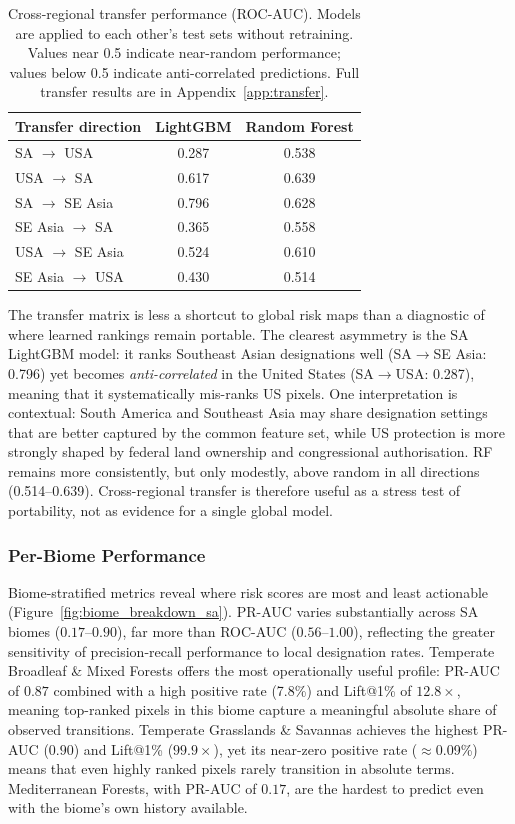 \documentclass[12pt]{article}
\theoremstyle{break}
\begin{document}
\begin{table}[H]
\centering
\caption{Cross-regional transfer performance (ROC-AUC). Models are applied to each
other's test sets without retraining. Values near 0.5 indicate near-random performance;
values below 0.5 indicate anti-correlated predictions. Full transfer results are in
Appendix~\ref{app:transfer}.}
\label{tab:cv3}
\begin{tabular}{lcc}
\toprule
\textbf{Transfer direction} & \textbf{LightGBM} & \textbf{Random Forest} \\
\midrule
SA $\to$ USA        & 0.287 & 0.538 \\
USA $\to$ SA        & 0.617 & 0.639 \\
SA $\to$ SE Asia    & 0.796 & 0.628 \\
SE Asia $\to$ SA    & 0.365 & 0.558 \\
USA $\to$ SE Asia   & 0.524 & 0.610 \\
SE Asia $\to$ USA   & 0.430 & 0.514 \\
\bottomrule
\end{tabular}
\end{table}

The transfer matrix is less a shortcut to global risk maps than a diagnostic of where
learned rankings remain portable. The clearest asymmetry is the SA LightGBM model: it
ranks Southeast Asian designations well (SA$\to$SE Asia: 0.796) yet becomes
\emph{anti-correlated} in the United States (SA$\to$USA: 0.287), meaning that it
systematically mis-ranks US pixels. One interpretation is contextual: South America
and Southeast Asia may share designation settings that are better captured by the
common feature set, while US protection is more strongly shaped by federal land
ownership and congressional authorisation. RF remains more consistently, but only
modestly, above random in all directions (0.514--0.639). Cross-regional transfer is
therefore useful as a stress test of portability, not as evidence for a single global
model.

\subsubsection{Per-Biome Performance}
\label{sec:results_biome_strat}

Biome-stratified metrics reveal where risk scores are most and least actionable
(Figure~\ref{fig:biome_breakdown_sa}). PR-AUC varies substantially across SA biomes
($0.17$--$0.90$), far more than ROC-AUC ($0.56$--$1.00$), reflecting the greater
sensitivity of precision-recall performance to local designation rates.
Temperate Broadleaf \& Mixed Forests offers the most operationally useful profile:
PR-AUC of $0.87$ combined with a high positive rate (7.8\%) and Lift@1\% of
$12.8\times$, meaning top-ranked pixels in this biome capture a meaningful absolute
share of observed transitions.
Temperate Grasslands \& Savannas achieves the highest PR-AUC ($0.90$) and Lift@1\%
($99.9\times$), yet its near-zero positive rate ($\approx$0.09\%) means that even
highly ranked pixels rarely transition in absolute terms.
Mediterranean Forests, with PR-AUC of $0.17$, are the hardest to predict even
with the biome's own history available.
\end{document}
